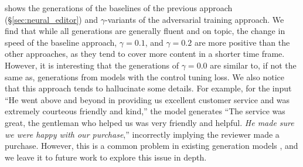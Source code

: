 shows the generations of the baselines of the previous approach (\S\ref{sec:neural_editor}) and $\gamma$-variants of the adversarial training approach. We find that while all generations are generally fluent and on topic, the change in speed of the baseline approach, $\gamma=0.1$, and $\gamma=0.2$ are more positive than the other approaches, as they tend to cover more content in a shorter time frame. However, it is interesting that the generations of $\gamma=0.0$ are similar to, if not the same as, generations from models with the control tuning loss. We also notice that this approach tends to hallucinate some details. For example, for the input ``He went above and beyond in providing us excellent customer service and was extremely courteous friendly and kind,'' the model generates ``The service was great, the gentleman who helped us was very friendly and helpful. \textit{He made sure we were happy with our purchase},'' incorrectly implying the reviewer made a purchase. However, this is a common problem in existing generation models \citep{ji2022survey}, and we leave it to future work to explore this issue in depth.

